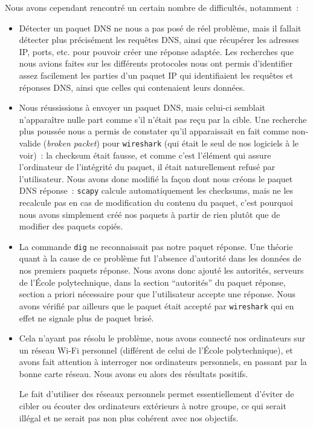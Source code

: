 \documentclass[a4paper, 12pt,twoside]{article}
\begin{document}
    \noindent Nous avons cependant rencontré un certain nombre de difficultés, notamment~:
    \begin{itemize}[label=\color{bleu303}\textbullet{}]
        \item Détecter un paquet DNS ne nous a pas posé de réel problème, mais il fallait détecter plus précisément les requêtes DNS, ainsi que récupérer les adresses IP, ports, etc. pour pouvoir créer une réponse adaptée. Les recherches que nous avions faites sur les différents protocoles nous ont permis d'identifier assez facilement les parties d'un paquet IP qui identifiaient les requêtes et réponses DNS, ainsi que celles qui contenaient leurs données.
        \item Nous réussissions à envoyer un paquet DNS, mais celui-ci semblait n'apparaître nulle part comme s'il n'était pas reçu par la cible. Une recherche plus poussée nous a permis de constater qu'il apparaissait en fait comme non-valide (\emph{broken packet}) pour \verb!wireshark! (qui était le seul de nos logiciels à le voir)~: la checksum était fausse, et comme c'est l'élément qui assure l'ordinateur de l'intégrité du paquet, il était naturellement refusé par l'utilisateur. Nous avons donc modifié la façon dont nous créons le paquet DNS réponse~: \verb!scapy! calcule automatiquement les checksums, mais ne les recalcule pas en cas de modification du contenu du paquet, c'est pourquoi nous avons simplement créé nos paquets à partir de rien plutôt que de modifier des paquets copiés.
        \item La commande \verb!dig! ne reconnaissait pas notre paquet réponse. Une théorie quant à la cause de ce problème fut l'absence d'autorité dans les données de nos premiers paquets réponse. Nous avons donc ajouté les autorités, serveurs de l'École polytechnique, dans la section “autorités” du paquet réponse, section a priori nécessaire pour que l'utilisateur accepte une réponse. Nous avons vérifié par ailleurs que le paquet était accepté par \verb!wireshark! qui en effet ne signale plus de paquet brisé.
        \item Cela n'ayant pas résolu le problème, nous avons connecté nos ordinateurs sur un réseau Wi-Fi personnel (différent de celui de l'École polytechnique), et avons fait attention à interroger nos ordinateurs personnels, en passant par la bonne carte réseau. Nous avons eu alors des résultats positifs.

        Le fait d'utiliser des réseaux personnels permet essentiellement d'éviter de cibler ou écouter des ordinateurs extérieurs à notre groupe, ce qui serait illégal et ne serait pas non plus cohérent avec nos objectifs.


\end{itemize}
\end{document}
